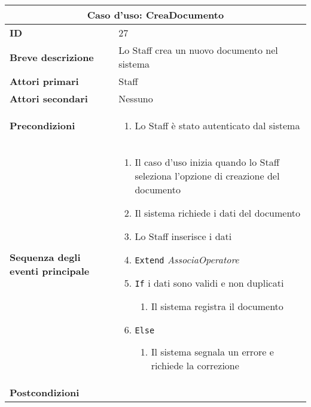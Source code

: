 \documentclass[a4paper]{report}
\begin{document}
\begin{table}[H]
\vspace*{-0cm}
\begin{tabular}{|p{3.9cm}|p{9.9cm}|}
\hline
\multicolumn{2}{|c|}{\textbf{Caso d’uso: CreaDocumento}} \\ \hline
	\textbf{ID} & 27 \\ \hline
	\textbf{Breve descrizione} & Lo Staff crea un nuovo documento nel sistema \\ \hline
	\textbf{Attori primari} & Staff \\ \hline
	\textbf{Attori secondari} & Nessuno \\ \hline
	\textbf{Precondizioni} & \begin{enumerate}[leftmargin=14pt,label=\arabic*.,labelsep=0.5em,topsep=0pt,partopsep=0pt,parsep=0pt,itemsep=0pt]
        \item Lo Staff è stato autenticato dal sistema
    \end{enumerate} \\ \hline
	\textbf{Sequenza degli eventi principale} &
\begin{enumerate}[leftmargin=14pt,label=\arabic*.,labelsep=0.5em,topsep=0pt,partopsep=0pt,parsep=0pt,itemsep=0pt]
    \item Il caso d’uso inizia quando lo Staff seleziona l'opzione di creazione del documento
    \item Il sistema richiede i dati del documento
    \item Lo Staff inserisce i dati
    \item \texttt{Extend} \textit{AssociaOperatore}
    \item \texttt{If} i dati sono validi e non duplicati
    \begin{enumerate}[label=\arabic{enumi}.\arabic*.,leftmargin=22pt,labelsep=0.5em,topsep=0pt,partopsep=0pt,parsep=0pt,itemsep=0pt]
        \item Il sistema registra il documento
    \end{enumerate}
    \item \texttt{Else}
    \begin{enumerate}[label=\arabic{enumi}.\arabic*.,leftmargin=22pt,labelsep=0.5em,topsep=0pt,partopsep=0pt,parsep=0pt,itemsep=0pt]
        \item Il sistema segnala un errore e richiede la correzione
    \end{enumerate}
\end{enumerate}\\ \hline
	\textbf{Postcondizioni} & \begin{enumerate}[label=\arabic*.,leftmargin=14pt,labelsep=0.5em,topsep=0pt,partopsep=0pt,parsep=0pt,itemsep=0pt]

\end{enumerate}
\end{tabular}
\end{table}
\end{document}
